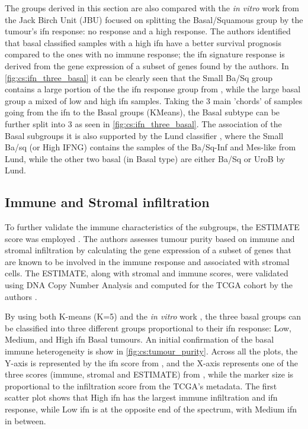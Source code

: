 The groups derived in this section are also compared with the \textit{in vitro} work \citet{Baker2022-bj} from the Jack Birch Unit (JBU) focused on splitting the Basal/Squamous group by the tumour's \acrfull{ifn} response: no response and a high response. The authors identified that basal classified samples with a high \acrshort{ifn} have a better survival prognosis compared to the ones with no immune response; the \acrshort{ifn} signature response is derived from the gene expression of a subset of genes found by the authors. In \cref{fig:cs:ifn_three_basal} it can be clearly seen that the Small Ba/Sq group contains a large portion of the the \acrshort{ifn} response group from \citet{Baker2022-bj}, while the large basal group a mixed of low and high \acrshort{ifn} samples. Taking the 3 main 'chords' of samples going from the \acrshort{ifn} to the Basal groups (KMeans), the Basal subtype can be further split into 3 as seen in \cref{fig:cs:ifn_three_basal}. The association of the Basal subgroups it is also supported by the Lund classifier \citep{Marzouka2018-ge}, where the Small Ba/sq (or High IFNG) contains the samples of the Ba/Sq-Inf and Mes-like from Lund, while the other two basal (in Basal type) are either Ba/Sq or UroB by Lund.

\subsection{Immune and Stromal infiltration}

To further validate the immune characteristics of the subgroups, the ESTIMATE score was employed \citep{Yoshihara2013-wq}. The authors assesses tumour purity based on immune and stromal infiltration by calculating the gene expression of a subset of genes that are known to be involved in the immune response and associated with stromal cells. The ESTIMATE, along with stromal and immune scores, were validated using DNA Copy Number Analysis and computed for the TCGA cohort by the authors \citep{Yoshihara2013-wq}.

By using both K-means (K=5) and the \textit{in vitro} work \citep{Baker2022-bj}, the three basal groups can be classified into three different groups proportional to their \acrfull{ifn} response: Low, Medium, and High \acrshort{ifn} Basal tumours. An initial confirmation of the basal immune heterogeneity is show in \cref{fig:cs:tumour_purity}. Across all the plots, the Y-axis is represented by the \acrshort{ifn} score from \citet{Baker2022-bj}, and the X-axis represents one of the three scores (immune, stromal and ESTIMATE) from \citet{Yoshihara2013-wq}, while the marker size is proportional to the infiltration score from the TCGA's metadata. The first scatter plot shows that High \acrshort{ifn} has the largest immune infiltration and \acrshort{ifn} response, while Low \acrshort{ifn} is at the opposite end of the spectrum, with Medium \acrshort{ifn} in between.

